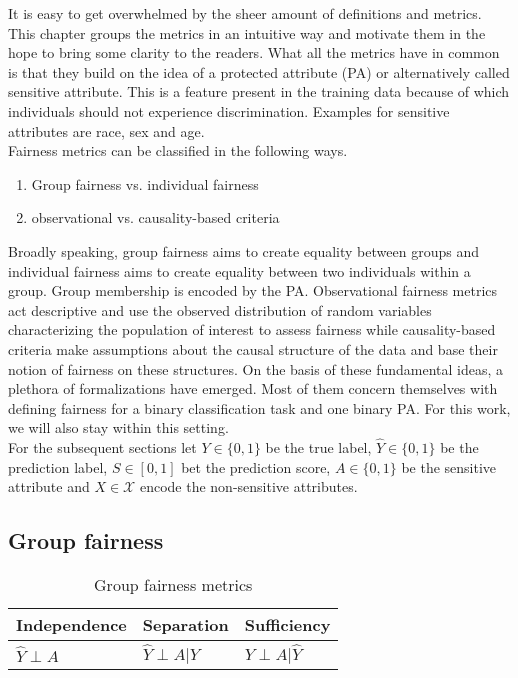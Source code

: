It is easy to get overwhelmed by the sheer amount of definitions and metrics. This chapter groups the metrics in an intuitive way and motivate them in the hope to bring some clarity to the readers. What all the metrics have in common is that they build on the idea of a protected attribute (PA) or alternatively called sensitive attribute. This is a feature present in the training data because of which individuals should not experience discrimination. Examples for sensitive attributes are race, sex and age. \\
Fairness metrics can be classified in the following ways.
\begin{enumerate}
    \item Group fairness vs. individual fairness
    \item observational vs. causality-based criteria
\end{enumerate}

Broadly speaking, group fairness aims to create equality between groups and individual fairness aims to create equality between two individuals within a group. Group membership is encoded by the PA. Observational fairness metrics act descriptive and use the observed distribution of random variables characterizing the population of interest to assess fairness while causality-based criteria make assumptions about the causal structure of the data and base their notion of fairness on these structures.
On the basis of these fundamental ideas, a plethora of formalizations have emerged. Most of them concern themselves with defining fairness for a binary classification task and one binary PA. For this work, we will also stay within this setting.\\
For the subsequent sections let $Y \in \{0, 1\}$ be the true label, $\hat{Y} \in \{0, 1\}$ be the prediction label, $S \in [0,1]$ bet the prediction score, $A \in \{0, 1\}$ be the sensitive attribute and $X \in \mathcal{X}$ encode the non-sensitive attributes.

\subsection{Group fairness}
\begin{table}
    \centering
    \begin{tabular}{lll}
        \toprule
        Independence & Separation & {Sufficiency} \\
        \midrule
        $\hat{Y} \perp A$ & $\hat{Y} \perp A | Y$ & {$Y \perp A | \hat{Y}$}\\
        \bottomrule
    \end{tabular}
    \caption{Group fairness metrics}
    \label{tab:group_fairness}
\end{table}

